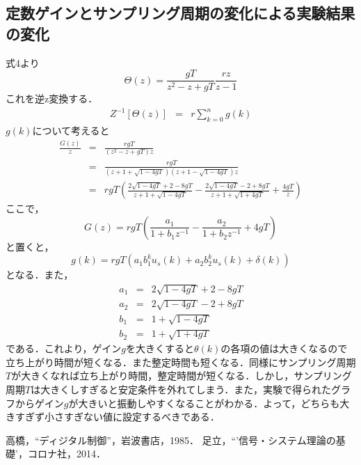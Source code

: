 \documentclass[11pt,a4paper]{jsarticle}
\begin{document}
\subsection{定数ゲインとサンプリング周期の変化による実験結果の変化}
式4より
\begin{equation}
 \Theta(z) = \frac{gT}{z^2-z+gT} \frac{rz}{z-1}
\end{equation}
これを逆z変換する．
\begin{eqnarray*}
Z^{-1}[\Theta(z)] & = & r\sum_{k = 0}^n g(k)
\end{eqnarray*}
$g(k)$について考えると
\begin{eqnarray}
 \frac{G(z)}{z} & = & \frac{rgT}{(z^2-z+gT)z} \nonumber \\
 & = & \frac{rgT}{(z+1+\sqrt{1-4gT})(z+1-\sqrt{1-4gT})z} \nonumber \\
 & = & rgT \left( \frac{2\sqrt{1-4gT} + 2 - 8gT}{z+1+\sqrt{1-4gT}} 
               - \frac{2\sqrt{1-4gT} - 2 + 8gT}{z+1+\sqrt{1+4gT}} 
               + \frac{4gT}{z} \right)
\end{eqnarray}
ここで，
\begin{equation}
 G(z) = rgT \left( \frac{a_1}{1 + b_1 z^{-1}} - \frac{a_2}{1 + b_2 z^{-1}} + 4gT \right)
\end{equation}
と置くと，
\begin{equation}
 g(k) = rgT(a_1 b_1^k u_s(k) + a_2 b_2^k u_s(k) + \delta(k))
\end{equation}
となる．また，
\begin{eqnarray*}
 a_1 & = & 2\sqrt{1-4gT} + 2 - 8gT \\
 a_2 & = & 2\sqrt{1-4gT} - 2 + 8gT \\
 b_1 & = & 1+\sqrt{1-4gT} \\
 b_2 & = & 1+\sqrt{1+4gT}
\end{eqnarray*}
である．これより，ゲイン$g$を大きくすると$\theta(k)$の各項の値は大きくなるので立ち上がり時間が短くなる．また整定時間も短くなる．同様にサンプリング周期$T$が大きくなれば立ち上がり時間，整定時間が短くなる．しかし，サンプリング周期$T$は大きくしすぎると安定条件を外れてしまう．また，実験で得られたグラフからゲイン$g$が大きいと振動しやすくなることがわかる．よって，どちらも大きすぎず小さすぎない値に設定するべきである．

\begin{thebibliography}{2}
 \bibitem{} 高橋，``ディジタル制御''，岩波書店，1985．
 \bibitem{} 足立，``'信号・システム理論の基礎'，コロナ社，2014．
\end{thebibliography}
\end{document}
